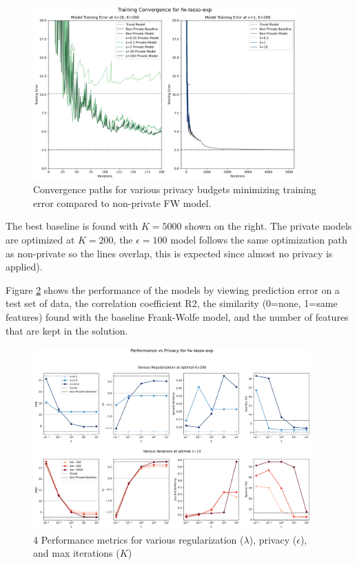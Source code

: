 \documentclass[12pt,letterpaper]{article}
\begin{document}
\begin{figure}[H]
    \centering
    \includegraphics[width=0.9\textwidth]{figure/lasso_convergence.png}
    \caption{Convergence paths for various privacy budgets minimizing training error compared to non-private FW model.}
    \label{fig:lasso_convergence}
\end{figure}

The best baseline is found with $K=5000$ shown on the right. The private models are optimized at $K=200$, the $\epsilon=100$ model follows the same optimization path as non-private so the lines overlap, this is expected since almost no privacy is applied).

Figure \ref{fig:lasso_results} shows the performance of the models by viewing prediction error on a test set of data, the correlation coefficient R2, the similarity (0=none, 1=same features) found with the baseline Frank-Wolfe model, and the number of features that are kept in the solution.

\begin{figure}[H]
    \centering
    \includegraphics[width=0.95\textwidth]{figure/lasso_results.png}
    \caption{4 Performance metrics for various regularization ($\lambda$), privacy ($\epsilon$), and max iterations ($K$)}
    \label{fig:lasso_results}
\end{figure}
\end{document}

